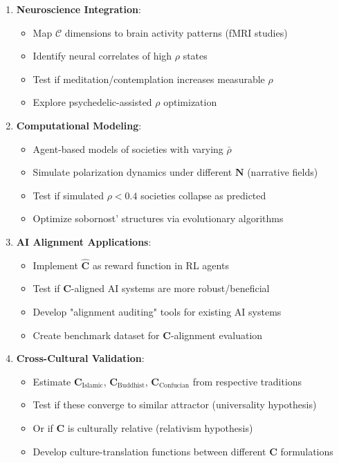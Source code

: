 \documentclass[11pt,a4paper]{article}
\theoremstyle{definition}
\theoremstyle{remark}
\newcommand{\CC}{\mathcal{C}}
\begin{document}
\begin{enumerate}
\begin{enumerate}[leftmargin=*]
\item \textbf{Neuroscience Integration}:
    \begin{itemize}
        \item Map \(\CC\) dimensions to brain activity patterns (fMRI studies)
        \item Identify neural correlates of high \(\rho\) states
        \item Test if meditation/contemplation increases measurable \(\rho\)
        \item Explore psychedelic-assisted \(\rho\) optimization
    \end{itemize}

\item \textbf{Computational Modeling}:
    \begin{itemize}
        \item Agent-based models of societies with varying \(\bar{\rho}\)
        \item Simulate polarization dynamics under different \(\mathbf{N}\) (narrative fields)
        \item Test if simulated \(\rho < 0.4\) societies collapse as predicted
        \item Optimize sobornost' structures via evolutionary algorithms
    \end{itemize}

\item \textbf{AI Alignment Applications}:
    \begin{itemize}
        \item Implement \(\hat{\mathbf{C}}\) as reward function in RL agents
        \item Test if \(\mathbf{C}\)-aligned AI systems are more robust/beneficial
        \item Develop "alignment auditing" tools for existing AI systems
        \item Create benchmark dataset for \(\mathbf{C}\)-alignment evaluation
    \end{itemize}

\item \textbf{Cross-Cultural Validation}:
    \begin{itemize}
        \item Estimate \(\mathbf{C}_{\text{Islamic}}\), \(\mathbf{C}_{\text{Buddhist}}\), \(\mathbf{C}_{\text{Confucian}}\) from respective traditions
        \item Test if these converge to similar attractor (universality hypothesis)
        \item Or if \(\mathbf{C}\) is culturally relative (relativism hypothesis)
        \item Develop culture-translation functions between different \(\mathbf{C}\) formulations
    \end{itemize}


\end{enumerate}
\end{enumerate}
\end{document}
